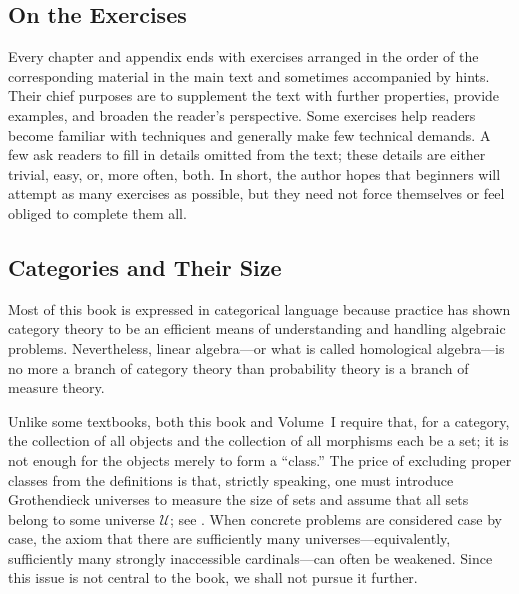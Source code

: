 \subsection*{On the Exercises}

Every chapter and appendix ends with exercises arranged in the order of the corresponding material in the main text and sometimes accompanied by hints. Their chief purposes are to supplement the text with further properties, provide examples, and broaden the reader's perspective. Some exercises help readers become familiar with techniques and generally make few technical demands. A few ask readers to fill in details omitted from the text; these details are either trivial, easy, or, more often, both. In short, the author hopes that beginners will attempt as many exercises as possible, but they need not force themselves or feel obliged to complete them all.

\subsection*{Categories and Their Size}

Most of this book is expressed in categorical language because practice has shown category theory to be an efficient means of understanding and handling algebraic problems. Nevertheless, linear algebra---or what is called homological algebra---is no more a branch of category theory than probability theory is a branch of measure theory.

Unlike some textbooks, both this book and Volume~I require that, for a category, the collection of all objects and the collection of all morphisms each be a set; it is not enough for the objects merely to form a ``class.'' The price of excluding proper classes from the definitions is that, strictly speaking, one must introduce Grothendieck universes to measure the size of sets and assume that all sets belong to some universe $\mathcal{U}$; see \cite[Assumption~1.5.2, Remark~1.5.6]{Li1}. When concrete problems are considered case by case, the axiom that there are sufficiently many universes---equivalently, sufficiently many strongly inaccessible cardinals---can often be weakened. Since this issue is not central to the book, we shall not pursue it further.
